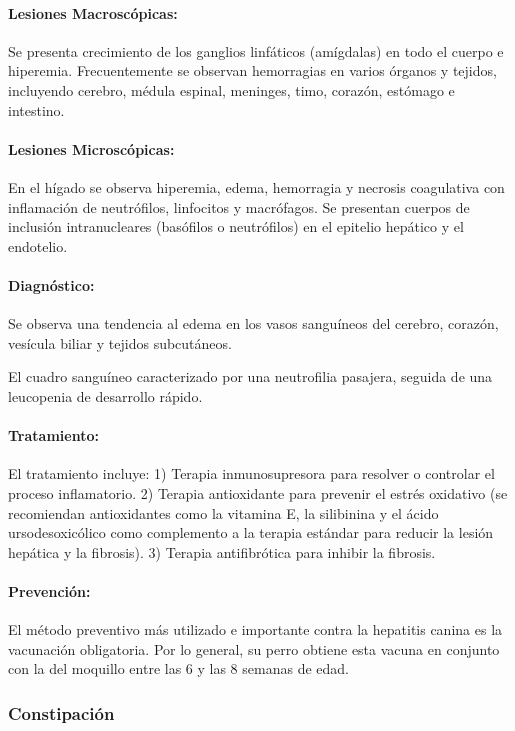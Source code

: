             \paragraph{Lesiones Macroscópicas:} Se presenta crecimiento de los ganglios linfáticos (amígdalas) en todo el cuerpo e hiperemia. Frecuentemente se observan hemorragias en varios órganos y tejidos, incluyendo cerebro, médula espinal, meninges, timo, corazón, estómago e intestino.

            \paragraph{Lesiones Microscópicas:} En el hígado se observa hiperemia, edema, hemorragia y necrosis coagulativa con inflamación de neutrófilos, linfocitos y macrófagos. Se presentan cuerpos de inclusión intranucleares (basófilos o neutrófilos) en el epitelio hepático y el endotelio.

            \paragraph{Diagnóstico:} Se observa una tendencia al edema en los vasos sanguíneos del cerebro, corazón, vesícula biliar y tejidos subcutáneos.

            El cuadro sanguíneo caracterizado por una neutrofilia pasajera, seguida de una leucopenia de desarrollo rápido.

            \paragraph{Tratamiento:} El tratamiento incluye: 1) Terapia inmunosupresora para resolver o controlar el proceso inflamatorio. 2) Terapia antioxidante para prevenir el estrés oxidativo (se recomiendan antioxidantes como la vitamina E, la silibinina y el ácido ursodesoxicólico como complemento a la terapia estándar para reducir la lesión hepática y la fibrosis). 3) Terapia antifibrótica para inhibir la fibrosis.

            \paragraph{Prevención:} El método preventivo más utilizado e importante contra la hepatitis canina es la vacunación obligatoria. Por lo general, su perro obtiene esta vacuna en conjunto con la del moquillo entre las 6 y las 8 semanas de edad.

        \subsubsection{Constipación}

